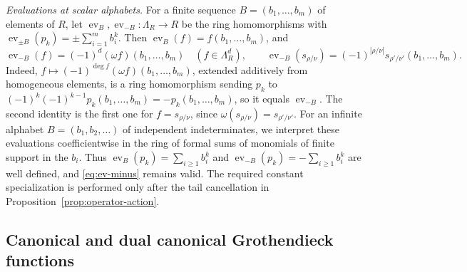 \documentclass[11pt]{amsart}
\numberwithin{equation}{section}
\theoremstyle{definition}
\theoremstyle{remark}
\newcommand{\Lam}{\Lambda}
\newcommand{\ev}{\operatorname{ev}}
\begin{document}
\emph{Evaluations at scalar alphabets.} For a finite sequence
$B=(b_1,\dots,b_m)$ of elements of $R$, let
$\ev_B,\ev_{-B}\colon\Lam_R\to R$ be the ring homomorphisms with
$\ev_{\pm B}(p_k)=\pm\sum_{i=1}^mb_i^k$. Then $\ev_B(f)=f(b_1,\dots,b_m)$, and
\begin{equation}\label{eq:ev-minus}
 \ev_{-B}(f)=(-1)^d(\omega f)(b_1,\dots,b_m)\quad(f\in\Lam^d_R),
 \qquad
 \ev_{-B}(s_{\rho/\nu})=(-1)^{|\rho/\nu|}s_{\rho'/\nu'}(b_1,\dots,b_m).
\end{equation}
Indeed, $f\mapsto(-1)^{\deg f}(\omega f)(b_1,\dots,b_m)$, extended additively
from homogeneous elements, is a ring homomorphism sending $p_k$ to
$(-1)^k(-1)^{k-1}p_k(b_1,\dots,b_m)=-p_k(b_1,\dots,b_m)$, so it equals
$\ev_{-B}$. The second identity is the first one for $f=s_{\rho/\nu}$, since
$\omega(s_{\rho/\nu})=s_{\rho'/\nu'}$. For an infinite alphabet $B=(b_1,b_2,\ldots)$ of independent
indeterminates, we interpret these evaluations coefficientwise
in the ring of formal sums of monomials of finite support in
the $b_i$. Thus
$\ev_B(p_k)=\sum_{i\geq1}b_i^k$ and
$\ev_{-B}(p_k)=-\sum_{i\geq1}b_i^k$ are well defined, and
\eqref{eq:ev-minus} remains valid. The required constant
specialization is performed only after the tail cancellation
in Proposition~\ref{prop:operator-action}.

\subsection{Canonical and dual canonical Grothendieck functions}
\label{subsec:canonical}
\end{document}
